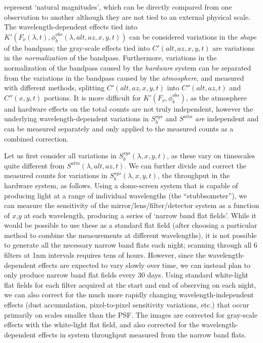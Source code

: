 \documentclass[12pt,preprint]{aastex}
\begin{document}
represent `natural magnitudes', which can be directly compared from
one observation to another although they are not tied to an external
physical scale. The wavelength-dependent effects tied into
$K'(F_\nu(\lambda,t), \phi_b^{obs}(\lambda,alt,az,x,y,t))$ can be
considered variations in the {\it shape} of the bandpass; the
gray-scale effects tied into $C'(alt,az,x,y,t)$ are variations in the
{\it normalization} of the bandpass.  Furthermore, variations in the
normalization of the bandpass caused by the {\it hardware} system can be separated from the
variations in the bandpass caused by the {\it atmosphere}, and
measured with different methods, splitting
$C'(alt,az,x,y,t)$ into $C''(alt,az,t)$ and $C''(x,y,t)$ portions. It
is more difficult for $K'(F_\nu, \phi_b^{obs})$, as the atmosphere and
hardware effects on the total counts are not truly independent,
however the underlying wavelength-dependent variations in $S_b^{sys}$
and $S^{atm}$ {\it are} independent and can be measured separately and
only applied to the measured counts as a combined correction. 

Let us first consider all variations in $S_b^{sys}(\lambda,x,y,t)$, as
these vary on timescales quite different from
$S^{atm}(\lambda,alt,az,t)$.  We can further divide and correct the
measured counts for variations in $S_b^{sys}(\lambda,x,y,t)$, the
throughput in the hardware system, as follows. Using a dome-screen
system that is capable of producing light at a range of individual
wavelengths (the ``stubbsometer''), we can measure the sensitivity of
the mirror/lens/filter/detector system as a function of $x$,$y$ at
each wavelength, producing a series of `narrow band flat
fields'. While it would be possible to use these as a standard flat
field (after choosing a particular method to combine the measurements
at different wavelengths), it is not possible to generate all the
necessary narrow band flats each night; scanning through all 6 filters
at 1nm intervals requires tens of hours. However, since the
wavelength-dependent effects are expected to vary slowly over time, we
can instead plan to only produce narrow band flat fields every 30
days. Using standard white-light flat fields for each filter acquired
at the start and end of observing on each night, we can also correct
for the much more rapidly changing wavelength-independent effects
(dust accumulation, pixel-to-pixel sensitivity variations, etc.) that
occur primarily on scales smaller than the PSF. The images are
corrected for gray-scale effects with the white-light flat field, and
also corrected for the wavelength-dependent effects in system
throughput measured from the narrow band flats.
\end{document}
